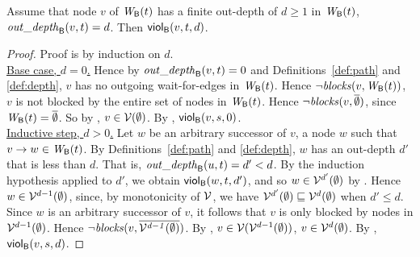 \begin{proposition} \label{prop:outdepth-finite-implies-scViol}
Assume that node $v$ of $\wfg{\B}{t}$ has a finite out-depth of $d \ge 1$ in $\wfg{\B}{t}$, \ie 
$\wodepth{\B}{v}{t} = d$. Then $\viol{v}{d}{t}$.  %
\end{proposition}
%
\begin{proof}
Proof is by induction on $d$.\\

\noindent
\ul{Base case, $d=0$.} Hence by $\wodepth{\B}{v}{t} = 0$ and Definitions~\ref{def:path} and \ref{def:depth},  
$v$ has no outgoing wait-for-edges in $\wfg{\B}{t}$. Hence $\neg \blocks{v}{\wfg{\B}{t}}$, \ie $v$ is not blocked by the entire set of nodes in 
$\wfg{\B}{t}$. Hence $\neg \blocks{v}{\compl{\ewfg}}$, since $\wfg{\B}{t} = \compl{\ewfg}$. So by , 
$v \in \VF{\ewfg}$. By , $\scVd{v}{0}{s}$.\\


\noindent
\ul{Inductive step, $d > 0$.}
Let $w$ be an arbitrary successor of $v$, \ie a node $w$ such that $v \ar w \in \wfg{\B}{t}$.
By Definitions~\ref{def:path} and \ref{def:depth}, $w$ has an out-depth $d'$ that is less than $d$. 
That is, $\wodepth{\B}{u}{t} = d' < d$.
By the induction hypothesis applied to $d'$, we obtain $\viol{w}{d'}{t}$, and so $w \in \VFs^{d'} (\ewfg)$ by .
Hence $w \in \VFs^{d-1} (\ewfg)$, since, by monotonicity of $\VFs$, we have $\VFs^{d'}(\ewfg) \subg \VFs^{d}(\ewfg)$ when $d' \le d$.
Since  $w$ is an arbitrary successor of $v$, it follows that $v$ is only blocked by nodes in $\VFs^{d-1} (\ewfg)$.
Hence $\neg \blocks{v}{\compl{\VFs^{d-1} (\ewfg)}}$. 
By , $v \in \VF{\VFs^{d-1} (\ewfg)}$, \ie $v \in \VFs^{d} (\ewfg)$.
By , $\scVd{v}{d}{s}$.
\end{proof}








